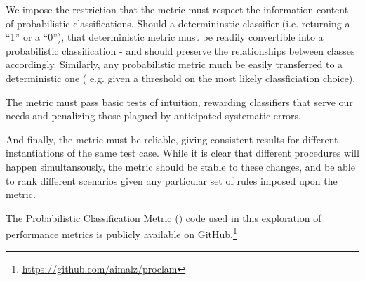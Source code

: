 We impose the restriction that the metric must respect the information content of probabilistic classifications.
Should a determininstic classifier (i.e. returning a ``1'' or a ``0''), that deterministic metric must be readily convertible into a probabilistic classification - and should preserve the relationships between classes accordingly.
Similarly, any probabilistic metric much be easily transferred to a deterministic one ( e.g. given a threshold on the most likely classficiation choice).

The metric must pass basic tests of intuition, rewarding classifiers that serve our needs and penalizing those plagued by anticipated systematic errors.

And finally, the metric must be reliable, giving consistent results for different instantiations of the same test case.
While it is clear that different procedures will happen simultansously, the metric should be stable to these changes, and be able to rank different scenarios given any particular set of rules imposed upon the metric.

The Probabilistic Classification Metric (\proclam) code used in this exploration of performance metrics is publicly available on GitHub.\footnote{\url{https://github.com/aimalz/proclam}}
